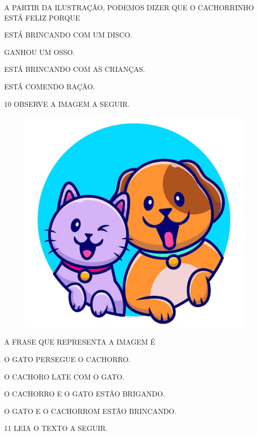 A PARTIR DA ILUSTRAÇÃO, PODEMOS DIZER QUE O CACHORRINHO ESTÁ FELIZ PORQUE

\begin{escolha}

\item ESTÁ BRINCANDO COM UM DISCO.

\item GANHOU UM OSSO.

\item ESTÁ BRINCANDO COM AS CRIANÇAS.

\item ESTÁ COMENDO RAÇÃO.

\end{escolha}

\num{10} OBSERVE A IMAGEM A SEGUIR.

\begin{figure}[H]
\centering
\includegraphics[width=.7\textwidth]{./media/image227.png}
\end{figure}

A FRASE QUE REPRESENTA A IMAGEM É

\begin{escolha}

\item O GATO PERSEGUE O CACHORRO.
\item O CACHORO LATE COM O GATO.
\item O CACHORRO E O GATO ESTÃO BRIGANDO.
\item O GATO E O CACHORROM ESTÃO BRINCANDO.

\end{escolha}

\num{11} LEIA O TEXTO A SEGUIR.

